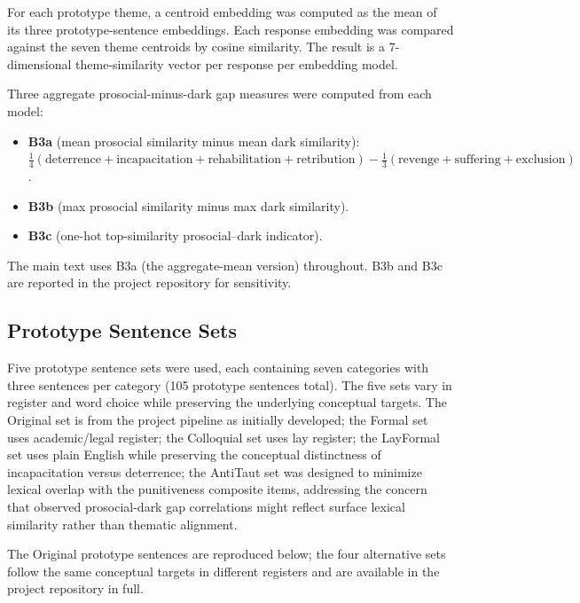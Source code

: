 For each prototype theme, a centroid embedding was computed as the mean of its three prototype-sentence embeddings. Each response embedding was compared against the seven theme centroids by cosine similarity. The result is a 7-dimensional theme-similarity vector per response per embedding model.

Three aggregate prosocial-minus-dark gap measures were computed from each model:
\begin{itemize}\itemsep -0.3em
\item \textbf{B3a} (mean prosocial similarity minus mean dark similarity): \\
$\frac{1}{4}(\text{deterrence} + \text{incapacitation} + \text{rehabilitation} + \text{retribution}) - \frac{1}{3}(\text{revenge} + \text{suffering} + \text{exclusion})$.
\item \textbf{B3b} (max prosocial similarity minus max dark similarity).
\item \textbf{B3c} (one-hot top-similarity prosocial--dark indicator).
\end{itemize}
The main text uses B3a (the aggregate-mean version) throughout. B3b and B3c are reported in the project repository for sensitivity.

\subsection{Prototype Sentence Sets}
\label{sec:supp_prototypes}

Five prototype sentence sets were used, each containing seven categories with three sentences per category (105 prototype sentences total). The five sets vary in register and word choice while preserving the underlying conceptual targets. The Original set is from the project pipeline as initially developed; the Formal set uses academic/legal register; the Colloquial set uses lay register; the LayFormal set uses plain English while preserving the conceptual distinctness of incapacitation versus deterrence; the AntiTaut set was designed to minimize lexical overlap with the punitiveness composite items, addressing the concern that observed prosocial-dark gap correlations might reflect surface lexical similarity rather than thematic alignment.

The Original prototype sentences are reproduced below; the four alternative sets follow the same conceptual targets in different registers and are available in the project repository in full.

